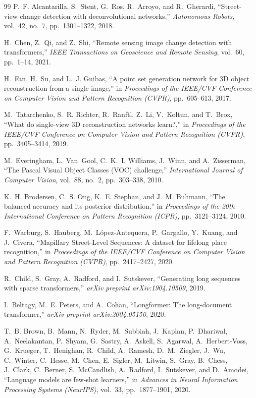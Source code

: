\documentclass{book}
\begin{document}
\begin{thebibliography}{99}
P.~F. Alcantarilla, S.~Stent, G.~Ros, R.~Arroyo, and R.~Gherardi, ``Street-view change detection with deconvolutional networks,'' \textit{Autonomous Robots}, vol.~42, no.~7, pp.~1301--1322, 2018.
 
H.~Chen, Z.~Qi, and Z.~Shi, ``Remote sensing image change detection with transformers,'' \textit{IEEE Transactions on Geoscience and Remote Sensing}, vol.~60, pp.~1--14, 2021.
 
H.~Fan, H.~Su, and L.~J. Guibas, ``A point set generation network for 3D object reconstruction from a single image,'' in \textit{Proceedings of the IEEE/CVF Conference on Computer Vision and Pattern Recognition (CVPR)}, pp.~605--613, 2017.
 
M.~Tatarchenko, S.~R. Richter, R.~Ranftl, Z.~Li, V.~Koltun, and T.~Brox, ``What do single-view 3D reconstruction networks learn?,'' in \textit{Proceedings of the IEEE/CVF Conference on Computer Vision and Pattern Recognition (CVPR)}, pp.~3405--3414, 2019.
 
M.~Everingham, L.~Van~Gool, C.~K.~I. Williams, J.~Winn, and A.~Zisserman, ``The Pascal Visual Object Classes (VOC) challenge,'' \textit{International Journal of Computer Vision}, vol.~88, no.~2, pp.~303--338, 2010.
 
K.~H. Brodersen, C.~S. Ong, K.~E. Stephan, and J.~M. Buhmann, ``The balanced accuracy and its posterior distribution,'' in \textit{Proceedings of the 20th International Conference on Pattern Recognition (ICPR)}, pp.~3121--3124, 2010.
 
F.~Warburg, S.~Hauberg, M.~L\'{o}pez-Antequera, P.~Gargallo, Y.~Kuang, and J.~Civera, ``Mapillary Street-Level Sequences: A dataset for lifelong place recognition,'' in \textit{Proceedings of the IEEE/CVF Conference on Computer Vision and Pattern Recognition (CVPR)}, pp.~2417--2427, 2020.
 
R.~Child, S.~Gray, A.~Radford, and I.~Sutskever, ``Generating long sequences with sparse transformers,'' \textit{arXiv preprint arXiv:1904.10509}, 2019.
 
I.~Beltagy, M.~E. Peters, and A.~Cohan, ``Longformer: The long-document transformer,'' \textit{arXiv preprint arXiv:2004.05150}, 2020.
 
T.~B. Brown, B.~Mann, N.~Ryder, M.~Subbiah, J.~Kaplan, P.~Dhariwal, A.~Neelakantan, P.~Shyam, G.~Sastry, A.~Askell, S.~Agarwal, A.~Herbert-Voss, G.~Krueger, T.~Henighan, R.~Child, A.~Ramesh, D.~M.~Ziegler, J.~Wu, C.~Winter, C.~Hesse, M.~Chen, E.~Sigler, M.~Litwin, S.~Gray, B.~Chess, J.~Clark, C.~Berner, S.~McCandlish, A.~Radford, I.~Sutskever, and D.~Amodei, ``Language models are few-shot learners,'' in \textit{Advances in Neural Information Processing Systems (NeurIPS)}, vol.~33, pp.~1877--1901, 2020.
 

\end{thebibliography}
\end{document}
